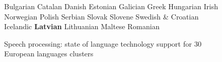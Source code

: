 \begin{figure}[t]
\begin{tabular}
Bulgarian \newline 
 Catalan \newline 
 Danish \newline 
 Estonian \newline 
 Galician \newline 
Greek \newline 
 Hungarian \newline 
 Irish \newline 
 Norwegian \newline 
Polish \newline 
 Serbian \newline 
 Slovak \newline 
Slovene \newline 
 Swedish\newline
 & \vspace*{0.5mm}Croatian \newline 
 Icelandic \newline 
\textbf{Latvian} \newline 
 Lithuanian \newline 
 Maltese  \newline 
Romanian
\end{tabular}
\caption{Speech processing: state of language technology support for 30 European languages clusters}
 \label{fig:mt_cluster_en}
\end{figure}
